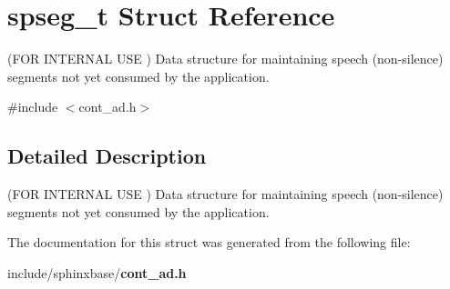 \section{spseg\-\_\-t Struct Reference}
\label{structspseg__t}


(F\-O\-R I\-N\-T\-E\-R\-N\-A\-L U\-S\-E ) Data structure for maintaining speech (non-\/silence) segments not yet consumed by the application.  




{\ttfamily \#include $<$cont\-\_\-ad.\-h$>$}



\subsection{Detailed Description}
(F\-O\-R I\-N\-T\-E\-R\-N\-A\-L U\-S\-E ) Data structure for maintaining speech (non-\/silence) segments not yet consumed by the application. 

The documentation for this struct was generated from the following file\-:\begin{DoxyCompactItemize}
\item 
include/sphinxbase/{\bf cont\-\_\-ad.\-h}\end{DoxyCompactItemize}
